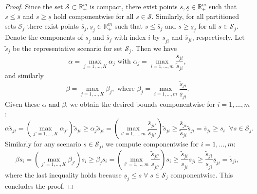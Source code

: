 \documentclass{article}
\newcommand{\mS}{\mathcal{S}}
\newcommand{\R}{\mathbb{R}}
\begin{document}
\begin{proof}%
Since the set \(\mS\subset\R^m_+\) is compact, there exist points \(\overline{s},\underline{s}\in\R^m_+\) such that \(s \leq \overline{s} \) and \(s \geq \underline{s} \) hold componentwise for all \( s \in \mS\).
Similarly, for all partitioned sets \(\mS_j\) there exist points \(\overline{s}_j,\underline{s}_j \in\R^m_+\) such that \(s \leq \overline{s}_j \) and \(s \geq \underline{s}_j \) for all \( s \in \mS_j\).
Denote the components of \(\underline{s}_j\) and \(\overline{s}_j\) with index $i$ by \(\underline{s}_{ji}\) and \(\overline{s}_{ji}\), respectively. 
Let \(\tilde{s}_j\) be the representative scenario for set \(\mS_j\).
Then we have 
\[
\alpha = \max_{j=1,\dots,K} \alpha_j \text{ with } \alpha_j = \max_{i=1,\dots,m}\frac{\overline{s}_{ji}}{\tilde{s}_{ji}},
\]
and similarly
\[
\beta = \max_{j=1,\dots,K} \beta_j, \text{ where } \beta_j = \max_{i=1,\dots,m}\frac{\tilde{s}_{ji}}{\underline{s}_{ji}}.
\]
Given these \(\alpha\) and \(\beta\), we obtain the desired bounds componentwise for $i=1,\ldots,m$:
\[
\alpha \tilde{s}_{ji} = \left(\max_{j'=1,\dots,K} \alpha_{j'}\right) \tilde{s}_{ji} \geq \alpha_{j} \tilde{s}_{ji} = \left(\max_{i'=1,\dots,m}\frac{\overline{s}_{ji'}}{\tilde{s}_{ji'}}\right) \tilde{s}_{ji} \geq \frac{\overline{s}_{ji}}{\tilde{s}_{ji}} \tilde{s}_{ji} = \overline{s}_{ji} \geq s_{i} \;\;\forall s \in \mS_{j}.
\]
Similarly for any scenario \(s \in \mS_{j}\), we compute componentwise for $i=1,\ldots,m$:
\[
\beta s_{i} = \left(\max_{j'=1,\dots,K} \beta_{j'}\right) s_{i} \geq \beta_{j} s_{i} = \left(\max_{i'=1,\dots,m}\frac{\tilde{s}_{ji'}}{\underline{s}_{ji'}}\right) s_{i} \geq \frac{\tilde{s}_{ji}}{\underline{s}_{ji}} s_{ji} \geq \frac{\tilde{s}_{ji}}{\underline{s}_{ji}} \underline{s}_{ji} = \tilde{s}_{ji},
\]
where the last inequality holds because \(\underline{s}_{j} \leq s \;\forall\; s \in \mathcal{S}_{j}\) componentwise. 
This concludes the proof.
\end{proof}
\end{document}
